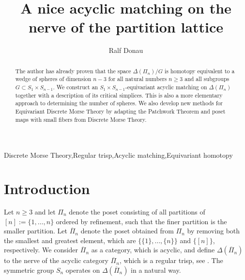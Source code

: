\documentclass{elsarticle}
\begin{document}
\begin{frontmatter}
\title{A nice acyclic matching on the nerve of the partition lattice}
\author[ruelle]{Ralf Donau}
\address[ruelle]{Fachbereich Mathematik, Universit\"at Bremen, Bibliothekstra\ss e 1, 28359 Bremen, Germany}
\begin{abstract}
The author has already proven that the space $\Delta(\Pi_n)/G$ is homotopy equivalent to a wedge of spheres of dimension $n-3$ for all natural numbers $n\geq 3$ and all subgroups $G\subset S_1\times S_{n-1}$. We construct an $S_1\times S_{n-1}$-equivariant acyclic matching on $\Delta(\Pi_n)$ together with a description of its critical simplices. This is also a more elementary approach to determining the number of spheres. We also develop new methods for Equivariant Discrete Morse Theory by adapting the Patchwork Theorem and poset maps with small fibers from Discrete Morse Theory.
\end{abstract}
\begin{keyword}
Discrete Morse Theory\sep Regular trisp\sep Acyclic matching\sep Equivariant homotopy
\end{keyword}
\end{frontmatter}
\section{Introduction}
Let $n\geq 3$ and let $\Pi_n$ denote the poset consisting of all partitions of $[n]:=\{1,\dots,n\}$ ordered by refinement, such that the finer partition is the smaller partition. Let $\overline{\Pi}_n$ denote the poset obtained from $\Pi_n$ by removing both the smallest and greatest element, which are $\{\{1\},\dots,\{n\}\}$ and $\{[n]\}$, respectively. We consider $\overline{\Pi}_n$ as a category, which is acyclic, and define $\Delta(\overline{\Pi}_n)$ to the nerve of the acyclic category $\overline{\Pi}_n$, which is a regular trisp, see \cite[Chapter 10]{buch}. The symmetric group $S_n$ operates on $\Delta(\overline{\Pi}_n)$ in a natural way.
\end{document}

